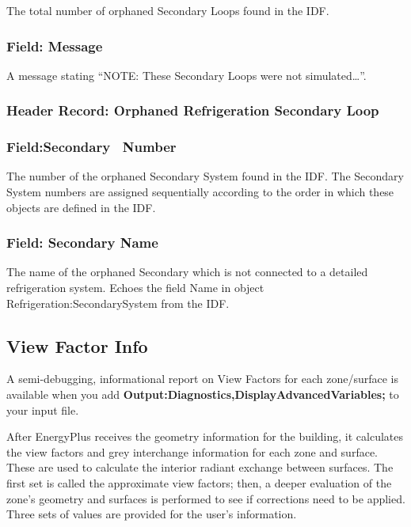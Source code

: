 The total number of orphaned Secondary Loops found in the IDF.

\subsubsection{Field: Message}\label{field-message-3}

A message stating ``NOTE: These Secondary Loops were not simulated\ldots{}''.

\subsubsection{Header Record: Orphaned Refrigeration Secondary Loop}\label{header-record-orphaned-refrigeration-secondary-loop}

\subsubsection{Field:Secondary ~Number}\label{fieldsecondary-number}

The number of the orphaned Secondary System found in the IDF. The Secondary System numbers are assigned sequentially according to the order in which these objects are defined in the IDF.

\subsubsection{Field: Secondary Name}\label{field-secondary-name-2}

The name of the orphaned Secondary which is not connected to a detailed refrigeration system. Echoes the field Name in object Refrigeration:SecondarySystem from the IDF.

\subsection{View Factor Info}\label{view-factor-info}

A semi-debugging, informational report on View Factors for each zone/surface is available when you add \textbf{Output:Diagnostics,DisplayAdvancedVariables;} to your input file.

After EnergyPlus receives the geometry information for the building, it calculates the view factors and grey interchange information for each zone and surface. These are used to calculate the interior radiant exchange between surfaces. The first set is called the approximate view factors; then, a deeper evaluation of the zone's geometry and surfaces is performed to see if corrections need to be applied. Three sets of values are provided for the user's information.

